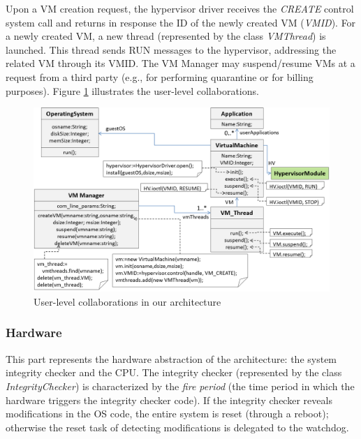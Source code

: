 Upon a VM creation request, the hypervisor driver receives the \textit{CREATE}
control system call and returns in response the ID of the newly created
VM (\textit{VMID}). For a newly created VM, a new thread (represented
by the class \textit{VMThread}) is launched. This thread sends RUN
messages to the hypervisor, addressing the related VM through its
VMID. The VM Manager may suspend/resume VMs at a request from a third
party (e.g., for performing quarantine or for billing purposes). Figure
\ref{fig:User-level-collaborations} illustrates the user-level collaborations. 

\begin{figure}
\begin{centering}
\includegraphics[width=12cm]{pictures/user-level}
\par\end{centering}

\caption{\label{fig:User-level-collaborations}User-level collaborations in
our architecture}
\end{figure}



\subsubsection{\label{sub:Hardware}Hardware}

This part represents the hardware abstraction of the architecture:
the system integrity checker and the CPU. The integrity checker (represented
by the class \textit{IntegrityChecker}) is characterized by the \textit{fire
period} (the time period in which the hardware triggers the integrity
checker code). If the integrity checker reveals modifications in the
OS code, the entire system is reset (through a reboot); otherwise
the reset task of detecting modifications is delegated to the watchdog.

